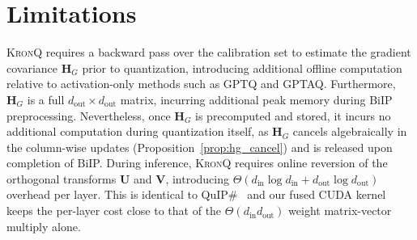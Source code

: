 \documentclass{article} %
\newcommand{\KronQ}{\textsc{KronQ}}
\begin{document}
\section{Limitations}
\label{limit}
\KronQ{} requires a backward pass over the calibration set to estimate the gradient covariance $\mathbf{H}_G$ prior to quantization, introducing additional offline computation relative to activation-only methods such as GPTQ and GPTAQ. Furthermore, $\mathbf{H}_G$ is a full $d_\mathrm{out} \times d_\mathrm{out}$ matrix, incurring additional peak memory during BiIP preprocessing. Nevertheless, once $\mathbf{H}_G$ is precomputed and stored, it incurs no additional computation during quantization itself, as $\mathbf{H}_G$ cancels algebraically in the column-wise updates (Proposition~\ref{prop:hg_cancel}) and is released upon completion of BiIP. During inference, \KronQ{} requires online reversion of the orthogonal transforms $\mathbf{U}$ and $\mathbf{V}$, introducing $\Theta(d_{\mathrm{in}} \log d_{\mathrm{in}} + d_{\mathrm{out}} \log d_{\mathrm{out}})$ overhead per layer. This is identical to QuIP\#~\citep{tseng2024quip} and our fused CUDA kernel keeps the per-layer cost close to that of the $\Theta(d_{\mathrm{in}} d_{\mathrm{out}})$ weight matrix-vector multiply alone.
\end{document}
